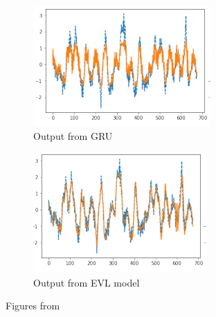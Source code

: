 \begin{figure}[h!]
  \centering
  \begin{subfigure}[b]{0.5\textwidth}
    \centering
    \caption{Output from GRU}
    \label{fig:evl-example1}
    \includegraphics[width=\textwidth]{./figs/illustrations/evl_example1.png}
    \hfill
  \end{subfigure}

  \begin{subfigure}[b]{0.5\textwidth}
    \centering
    \caption{Output from EVL model}
    \label{fig:evl-example2}
    \includegraphics[width=\textwidth]{./figs/illustrations/evl_example2.png}
    \hfill
  \end{subfigure}
  \caption{Figures from \cite{Ding2019}}
  \label{fig:evl}
\end{figure}
